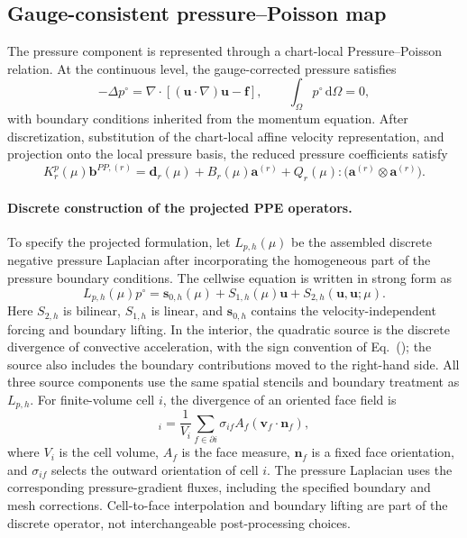 \subsection{Gauge-consistent pressure--Poisson map}

The pressure component is represented through a chart-local
Pressure--Poisson relation.
At the continuous level, the gauge-corrected pressure satisfies
\begin{equation}
    -\Delta p^\circ
    =
    \nabla\!\cdot
    \left[
        (\bm u\!\cdot\!\nabla)\bm u
        -
        \bm f
    \right],
    \qquad
    \int_\Omega p^\circ\,\mathrm d\Omega=0,
    \label{eq:app_continuous_pressure_poisson}
\end{equation}
with boundary conditions inherited from the momentum equation.
After discretization, substitution of the chart-local affine velocity
representation, and projection onto the local pressure basis, the reduced
pressure coefficients satisfy
\begin{equation}
    K_r^p(\mu)\bm b^{PP,(r)}
    =
    \bm d_r(\mu)
    +
    B_r(\mu)\bm a^{(r)}
    +
    Q_r(\mu):
    \bigl(
        \bm a^{(r)}\otimes\bm a^{(r)}
    \bigr).
    \label{eq:app_pressure_poisson_system}
\end{equation}
\paragraph{Discrete construction of the projected PPE operators.}
To specify the projected formulation, let $L_{p,h}(\mu)$ be the assembled discrete negative pressure Laplacian after incorporating the homogeneous part of the pressure boundary conditions. The cellwise equation is written in strong form as
\begin{equation}
 L_{p,h}(\mu)p^\circ
 =\bm s_{0,h}(\mu)+S_{1,h}(\mu)\bm u
   +S_{2,h}(\bm u,\bm u;\mu).
 \label{eq:app_discrete_ppe_source}
\end{equation}
Here $S_{2,h}$ is bilinear, $S_{1,h}$ is linear, and $\bm s_{0,h}$ contains the velocity-independent forcing and boundary lifting. In the interior, the quadratic source is the discrete divergence of convective acceleration, with the sign convention of Eq.~(); the source also includes the boundary contributions moved to the right-hand side. All three source components use the same spatial stencils and boundary treatment as $L_{p,h}$. For finite-volume cell $i$, the divergence of an oriented face field is
\begin{equation}
 [D_h\bm v_f]_i=\frac{1}{V_i}\sum_{f\in\partial i}
 \sigma_{if}A_f(\bm v_f\cdot\bm n_f),
 \label{eq:app_fv_divergence_definition}
\end{equation}
where $V_i$ is the cell volume, $A_f$ is the face measure, $\bm n_f$ is a fixed face orientation, and $\sigma_{if}$ selects the outward orientation of cell $i$. The pressure Laplacian uses the corresponding pressure-gradient fluxes, including the specified boundary and mesh corrections. Cell-to-face interpolation and boundary lifting are part of the discrete operator, not interchangeable post-processing choices.

